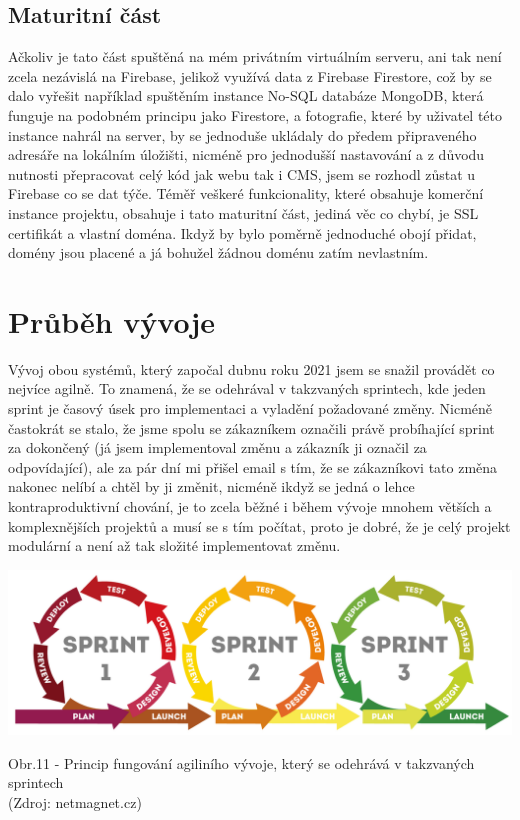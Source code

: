 \documentclass[12pt,a4paper]{report}
\begin{document}
  \section{Maturitní část}
  Ačkoliv je tato část spuštěná na mém privátním virtuálním serveru, ani tak není zcela
  nezávislá na Firebase, jelikož využívá data z Firebase Firestore, což by se dalo vyřešit
  například spuštěním instance No-SQL databáze MongoDB, která funguje na podobném principu jako 
  Firestore, a fotografie, které by uživatel této instance nahrál na server, by se jednoduše ukládaly
  do předem připraveného adresáře na lokálním úložišti, nicméně pro jednodušší nastavování a z důvodu nutnosti
  přepracovat celý kód jak webu tak i CMS, jsem se rozhodl zůstat u Firebase co se dat týče. 
  Téměř veškeré funkcionality, které obsahuje komerční instance projektu, obsahuje i tato maturitní část, 
  jediná věc co chybí, je SSL certifikát a vlastní doména. Ikdyž by bylo poměrně jednoduché obojí přidat,
  domény jsou placené a já bohužel žádnou doménu zatím nevlastním.
 
  \chapter{Průběh vývoje}
  Vývoj obou systémů, který započal dubnu roku 2021 jsem se snažil provádět co nejvíce agilně. To znamená,
  že se odehrával v takzvaných sprintech, kde jeden sprint je časový úsek pro implementaci a vyladění požadované změny.
  Nicméně častokrát se stalo, že jsme spolu se zákazníkem označili právě probíhající sprint za dokončený (já jsem implementoval změnu a zákazník ji označil za odpovídající), ale za pár dní mi 
  přišel email s tím, že se zákazníkovi tato změna nakonec nelíbí a chtěl by ji změnit, nicméně ikdyž se jedná o lehce kontraproduktivní chování, 
  je to zcela běžné i během vývoje mnohem větších a komplexnějších projektů a musí se s tím počítat, proto je dobré, že je celý projekt modulární a není až tak složité implementovat změnu.
  
  \vspace*{0.5cm}
  \noindent\includegraphics[width=\linewidth]{agile.png}
  \begin{center}
    Obr.11 -  Princip fungování agiliního vývoje, který se odehrává v takzvaných sprintech \\
    (Zdroj: netmagnet.cz)
  \end{center}
  \vspace*{0.5cm}
 
\end{document}
